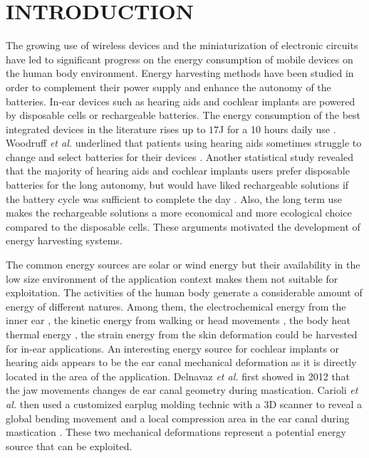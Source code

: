 \documentclass[3p,twocolumn,preprint]{elsarticle}
\begin{document}
\section{INTRODUCTION}
\label{INTRODUCTION}
The growing use of wireless devices and the miniaturization of electronic circuits have led to significant progress on the energy consumption of mobile devices on the human body environment. Energy harvesting methods have been studied in order to complement their power supply and enhance the autonomy of the batteries. In-ear devices such as hearing aids and cochlear implants are powered by disposable cells or rechargeable batteries. The energy consumption of the best integrated devices in the literature rises up to $17$J for a 10 hours daily use \cite{Scherer2019,Yip2015,Kulah2022}. Woodruff \emph{et al.} underlined that patients using hearing aids sometimes struggle to change and select batteries for their devices \cite{Woodruff2021}. Another statistical study revealed that the majority of hearing aids and cochlear implants users prefer disposable batteries for the long autonomy, but would have liked rechargeable solutions if the battery cycle was sufficient to complete the day \cite{PracticesAudiology2016}. Also, the long term use makes the rechargeable solutions a more economical and more ecological choice compared to the disposable cells. These arguments motivated the development of energy harvesting systems.

The common energy sources are solar or wind energy but their availability in the low size environment of the application context makes them not suitable for exploitation. The activities of the human body generate a considerable amount of energy of different natures. Among them, the electrochemical energy from the inner ear \cite{Mercier2012}, the kinetic energy from walking or head movements \cite{Azimi2021,Smilek2016}, the body heat thermal energy \cite{Kim2014}, the strain energy from the skin deformation \cite{Jin2021} could be harvested for in-ear applications. An interesting energy source for cochlear implants or hearing aids appears to be the ear canal mechanical deformation as it is directly located in the area of the application. Delnavaz \emph{et al.} first showed in 2012 that the jaw movements changes de ear canal geometry during mastication. Carioli \emph{et al.} then used a customized earplug molding technic with a 3D scanner to reveal a global bending movement and a local compression area in the ear canal during mastication \cite{Carioli2016}. These two mechanical deformations represent a potential energy source that can be exploited.
\end{document}
